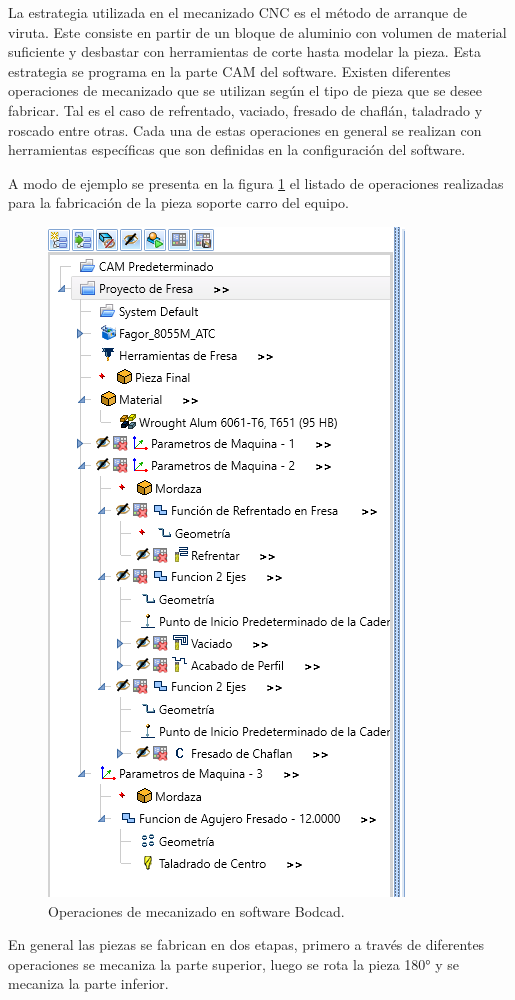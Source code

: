 La estrategia utilizada en el mecanizado CNC es el método de arranque de viruta. Este consiste en partir de un bloque de aluminio con volumen de material suficiente y desbastar con herramientas de corte hasta modelar la pieza. Esta estrategia se programa en la parte CAM del software. Existen diferentes operaciones de mecanizado que se utilizan según el tipo de pieza que se desee fabricar. Tal es el caso de refrentado, vaciado, fresado de chaflán, taladrado y roscado entre otras. Cada una de estas operaciones  en general se realizan con herramientas específicas que son definidas en la configuración del software.

A modo de ejemplo se presenta en la figura \ref{fig:estrategia} el listado de operaciones realizadas para la fabricación de la pieza soporte carro del equipo.

\begin{figure}[h]
	\centering
	\includegraphics[width=.55\textwidth]{./Figures/3d_estrategia.png}
	\caption{Operaciones de mecanizado en software Bodcad.}
	\label{fig:estrategia}
\end{figure}

En general las piezas se fabrican en dos etapas, primero a través de diferentes operaciones se mecaniza la parte superior, luego se rota la pieza 180° y se mecaniza la parte inferior.


